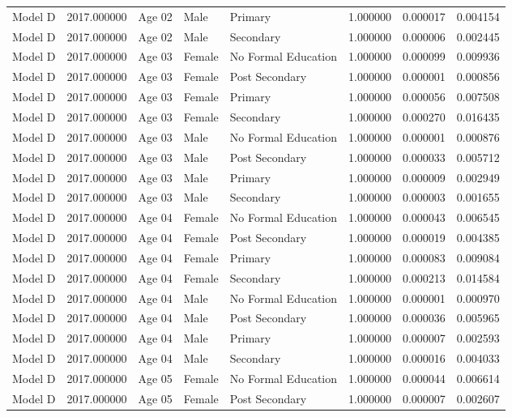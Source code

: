\begin{table}[ht]
\begin{tabular}{lrlllrrr}
Model D & 2017.000000 & Age 02 & Male & Primary & 1.000000 & 0.000017 & 0.004154 \\
Model D & 2017.000000 & Age 02 & Male & Secondary & 1.000000 & 0.000006 & 0.002445 \\
Model D & 2017.000000 & Age 03 & Female & No Formal Education & 1.000000 & 0.000099 & 0.009936 \\
Model D & 2017.000000 & Age 03 & Female & Post Secondary & 1.000000 & 0.000001 & 0.000856 \\
Model D & 2017.000000 & Age 03 & Female & Primary & 1.000000 & 0.000056 & 0.007508 \\
Model D & 2017.000000 & Age 03 & Female & Secondary & 1.000000 & 0.000270 & 0.016435 \\
Model D & 2017.000000 & Age 03 & Male & No Formal Education & 1.000000 & 0.000001 & 0.000876 \\
Model D & 2017.000000 & Age 03 & Male & Post Secondary & 1.000000 & 0.000033 & 0.005712 \\
Model D & 2017.000000 & Age 03 & Male & Primary & 1.000000 & 0.000009 & 0.002949 \\
Model D & 2017.000000 & Age 03 & Male & Secondary & 1.000000 & 0.000003 & 0.001655 \\
Model D & 2017.000000 & Age 04 & Female & No Formal Education & 1.000000 & 0.000043 & 0.006545 \\
Model D & 2017.000000 & Age 04 & Female & Post Secondary & 1.000000 & 0.000019 & 0.004385 \\
Model D & 2017.000000 & Age 04 & Female & Primary & 1.000000 & 0.000083 & 0.009084 \\
Model D & 2017.000000 & Age 04 & Female & Secondary & 1.000000 & 0.000213 & 0.014584 \\
Model D & 2017.000000 & Age 04 & Male & No Formal Education & 1.000000 & 0.000001 & 0.000970 \\
Model D & 2017.000000 & Age 04 & Male & Post Secondary & 1.000000 & 0.000036 & 0.005965 \\
Model D & 2017.000000 & Age 04 & Male & Primary & 1.000000 & 0.000007 & 0.002593 \\
Model D & 2017.000000 & Age 04 & Male & Secondary & 1.000000 & 0.000016 & 0.004033 \\
Model D & 2017.000000 & Age 05 & Female & No Formal Education & 1.000000 & 0.000044 & 0.006614 \\
Model D & 2017.000000 & Age 05 & Female & Post Secondary & 1.000000 & 0.000007 & 0.002607 \\

\end{tabular}
\end{table}
